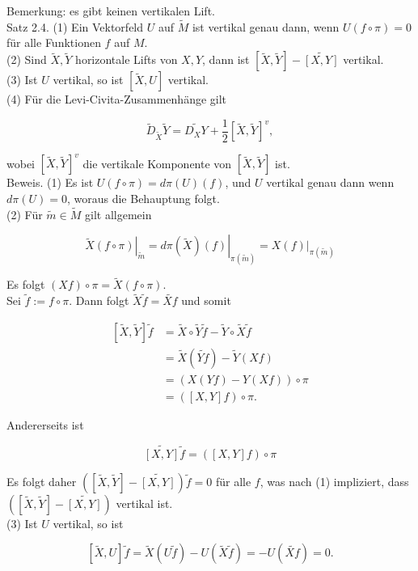 \documentclass[10pt]{article}
\begin{document}
Bemerkung: es gibt keinen vertikalen Lift.\\
Satz 2.4. (1) Ein Vektorfeld $U$ auf $\tilde{M}$ ist vertikal genau dann, wenn $U(f \circ \pi)=0$ für alle Funktionen $f$ auf $M$.\\
(2) Sind $\tilde{X}, \tilde{Y}$ horizontale Lifts von $X, Y$, dann ist $[\tilde{X}, \tilde{Y}]-\widetilde{[X, Y]}$ vertikal.\\
(3) Ist $U$ vertikal, so ist $[\tilde{X}, U]$ vertikal.\\
(4) Für die Levi-Civita-Zusammenhänge gilt

$$
\tilde{D}_{\tilde{X}} \tilde{Y}=\widetilde{D_{X} Y}+\frac{1}{2}[\tilde{X}, \tilde{Y}]^{v},
$$

wobei $[\tilde{X}, \tilde{Y}]^{v}$ die vertikale Komponente von $[\tilde{X}, \tilde{Y}]$ ist.\\
Beweis. (1) Es ist $U(f \circ \pi)=d \pi(U)(f)$, und $U$ vertikal genau dann wenn $d \pi(U)=0$, woraus die Behauptung folgt.\\
(2) Für $\tilde{m} \in \tilde{M}$ gilt allgemein

$$
\left.\tilde{X}(f \circ \pi)\right|_{\tilde{m}}=\left.d \pi(\tilde{X})(f)\right|_{\pi(\tilde{m})}=\left.X(f)\right|_{\pi(\tilde{m})}
$$

Es folgt $(X f) \circ \pi=\tilde{X}(f \circ \pi)$.\\
Sei $\tilde{f}:=f \circ \pi$. Dann folgt $\tilde{X} \tilde{f}=\widetilde{X f}$ und somit

$$
\begin{aligned}
{[\tilde{X}, \tilde{Y}] \tilde{f} } & =\tilde{X} \circ \tilde{Y} \tilde{f}-\tilde{Y} \circ \tilde{X} \tilde{f} \\
& =\tilde{X}(\tilde{Y f})-\tilde{Y}(X f) \\
& =(X(Y f)-Y(X f)) \circ \pi \\
& =([X, Y] f) \circ \pi .
\end{aligned}
$$

Andererseits ist

$$
\widetilde{[X, Y]} \tilde{f}=([X, Y] f) \circ \pi
$$

Es folgt daher $([\tilde{X}, \tilde{Y}]-\widetilde{[X, Y]}) \tilde{f}=0$ für alle $f$, was nach (1) impliziert, dass $([\tilde{X}, \tilde{Y}]-\widetilde{[X, Y]})$ vertikal ist.\\
(3) Ist $U$ vertikal, so ist

$$
[\tilde{X}, U] \tilde{f}=\tilde{X}(U \tilde{f})-U(\tilde{X} \tilde{f})=-U(\widetilde{X f})=0 .
$$
\end{document}
